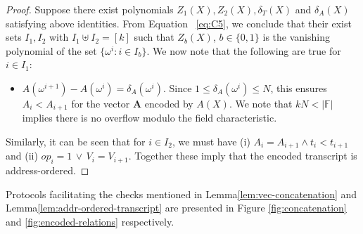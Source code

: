\documentclass[sigconf]{acmart}
\renewcommand{\vec}{\mathbf} %
\newcommand{\op}{{op}} %
\newcommand{\F}{\mathbb{F}}
\providecommand{\DIFaddtex}[1]{{\protect\color{blue}\uwave{#1}}} %
\providecommand{\DIFdeltex}[1]{{\protect\color{red}\sout{#1}}}                      %
\providecommand{\DIFaddbegin}{} %
\providecommand{\DIFaddend}{} %
\providecommand{\DIFdelbegin}{} %
\providecommand{\DIFdelend}{} %
\providecommand{\DIFadd}[1]{\texorpdfstring{\DIFaddtex{#1}}{#1}} %
\providecommand{\DIFdel}[1]{\texorpdfstring{\DIFdeltex{#1}}{}} %
\newcommand{\DIFscaledelfig}{0.5}
\newlength{\DIFdelgraphicswidth} %
\newlength{\DIFdelgraphicsheight} %
\newcommand{\DIFaddincludegraphics}[2][]{{\color{blue}\fbox{\DIFOincludegraphics[#1]{#2}}}} %
\newcommand{\DIFdelincludegraphics}[2][]{%
	\sbox{\DIFdelgraphicsbox}{\DIFOincludegraphics[#1]{#2}}%
	\settoboxwidth{\DIFdelgraphicswidth}{\DIFdelgraphicsbox} %
	\settoboxtotalheight{\DIFdelgraphicsheight}{\DIFdelgraphicsbox} %
	\scalebox{\DIFscaledelfig}{%
		\parbox[b]{\DIFdelgraphicswidth}{\usebox{\DIFdelgraphicsbox}\\[-\baselineskip] \rule{\DIFdelgraphicswidth}{0em}}\llap{\resizebox{\DIFdelgraphicswidth}{\DIFdelgraphicsheight}{%
				\setlength{\unitlength}{\DIFdelgraphicswidth}%
				\begin{picture}(1,1)%
					\thicklines\linethickness{2pt} %
					{\color[rgb]{1,0,0}\put(0,0){\framebox(1,1){}}}%
					{\color[rgb]{1,0,0}\put(0,0){\line( 1,1){1}}}%
					{\color[rgb]{1,0,0}\put(0,1){\line(1,-1){1}}}%
				\end{picture}%
			}\hspace*{3pt}}} %
} %
\DeclareRobustCommand{\DIFaddbegin}{\DIFOaddbegin \let\includegraphics\DIFaddincludegraphics} %
\DeclareRobustCommand{\DIFaddend}{\DIFOaddend \let\includegraphics\DIFOincludegraphics} %
\DeclareRobustCommand{\DIFdelbegin}{\DIFOdelbegin \let\includegraphics\DIFdelincludegraphics} %
\DeclareRobustCommand{\DIFdelend}{\DIFOaddend \let\includegraphics\DIFOincludegraphics} %
\begin{document}
		\begin{proof}
			Suppose there exist polynomials $Z_1(X),Z_2(X),\delta_T(X)$ and $\delta_A(X)$ satisfying above identities. From Equation
			~\eqref{eq:C5}, we conclude that their exist sets $I_1,I_2$ with \DIFdelbegin \DIFdel{$I_1\uplus I_2=[k]$ }\DIFdelend \DIFaddbegin \DIFadd{$I_1\uplus I_2=[k-1]$ }\DIFaddend such that $Z_b(X)$, \DIFdelbegin \DIFdel{$b\in \{0,1\}$ }\DIFdelend \DIFaddbegin \DIFadd{$b\in \{1,2\}$ }\DIFaddend is the
			vanishing polynomial of the set $\{\omega^i: i\in I_b\}$. We now note that the following are true for $i\in I_1$:
			\begin{itemize}[leftmargin=1em]
				\item $A(\omega^{i+1})-A(\omega^i)=\delta_A(\omega^i)$. Since $1\leq \delta_A(\omega^i)\leq N$, this ensures $A_i < A_{i+1}$ for the vector $\vec{A}$ encoded
				by $A(X)$. We note that $kN < |\F|$ implies there is no overflow modulo the field characteristic.
			\end{itemize}
			Similarly, it can be seen that for $i\in I_2$, we must have (i) $A_i=A_{i+1}\wedge t_i < t_{i+1}$
			and (ii) $\op_i=1\,\vee\,V_i=V_{i+1}$. Together these imply that the encoded transcript is address-ordered.
		\end{proof}
		
		Protocols facilitating the checks mentioned in Lemma\DIFaddbegin \DIFadd{~}\DIFaddend \ref{lem:vec-concatenation} and Lemma\DIFaddbegin \DIFadd{~}\DIFaddend \ref{lem:addr-ordered-transcript} are presented in Figure \ref{fig:concatenation} and \ref{fig:encoded-relations} respectively.
		
\end{document}
